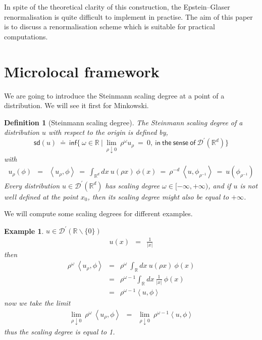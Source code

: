 \documentclass[10pt]{book}
\newcommand{\sd}{\mathsf{sd}}
\newcommand{\abs}[1]{\left|#1\right|}
\newcommand{\sm}[1]{\left\langle#1\right\rangle}
\renewcommand{\inf}{\mathsf{inf}}
\let\int\int
\newcommand{\Dcal}{\mathcal{D}}
\newcommand{\Rbb}{\mathbb{R}}
\theoremstyle{break}
\newtheorem{example}{Example}
\newtheorem{definition}{Definition}
\begin{document}
In spite of the theoretical clarity of this construction, the Epstein--Glaser renormalisation is quite difficult to implement in practise. The aim of this paper is to discuss a renormalisation scheme which is suitable for practical computations.



\section{Microlocal framework}


We are going to introduce the Steinmann scaling degree at a point of a distribution. We will see it first for Minkowski.

\begin{definition}[Steinmann scaling degree]
 The Steinmann scaling degree of a distribution $u$ with respect to the origin is defined by,
 \begin{equation*}
  \sd(u) \ \doteq \ \inf\bigg\{ \ \omega \in \Rbb \ \bigg| \ \lim_{\rho \downarrow 0} \ \rho^\omega u_\rho \ = \ 0, \ \mathsf{in \ the \ sense \ of \ } \Dcal^\prime(\Rbb^d) \bigg\}
 \end{equation*}
 with 
 \begin{eqnarray*}
  u_\rho(\phi) &=& \sm{u_\rho , \phi} \ = \ \int_{\Rbb^d} dx \ u(\rho x) \ \phi(x) \ = \ \rho^{-d} \ \sm{u , \phi_{\rho^{-1}}} \ = \ u(\phi_{\rho^{-1}})
 \end{eqnarray*}
 Every distribution $u \in \Dcal^\prime(\Rbb^d)$ has scaling degree $\omega \in [-\infty,+\infty)$, and if $u$ is not well defined at the point $x_0$, then its scaling degree might also be equal to $+\infty$. 
\end{definition}

We will compute some scaling degrees for different examples.

\begin{example} 
 $u \in \Dcal^\prime(\Rbb \backslash \{0\})$
 \begin{eqnarray*}
  u(x) &=& \frac{1}{\abs{x}}
 \end{eqnarray*}
 then
 \begin{eqnarray*}
  \rho^\omega \ \sm{u_\rho,\phi} &=& \rho^\omega \ \int_\Rbb dx \ u(\rho x) \ \phi(x) \\
  &=& \rho^{\omega-1} \int_\Rbb dx \ \frac{1}{\abs{x}} \ \phi(x) \\
  &=& \rho^{\omega-1} \sm{u , \phi}
 \end{eqnarray*}
 now we take the limit
 \begin{eqnarray*}
  \lim_{\rho \downarrow 0} \ \rho^\omega \ \sm{u_\rho,\phi} &=& \lim_{\rho \downarrow 0} \ \rho^{\omega-1} \sm{u , \phi} 
 \end{eqnarray*}
 thus the scaling degree is equal to 1. 
\end{example}
\end{document}
